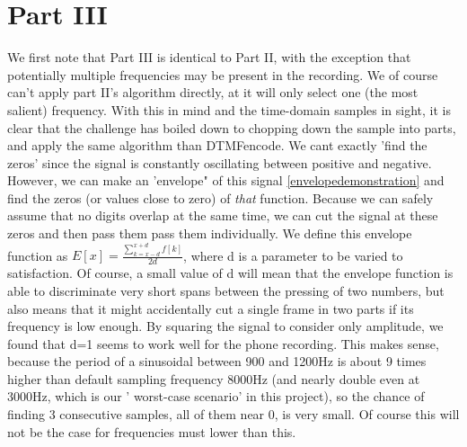 \documentclass{article}
\begin{document}
\section{Part III}
We first note that Part III is identical to Part II, with the exception that potentially multiple frequencies may be present in the recording. We of course can't apply part II's algorithm directly, at it will only select one (the most salient) frequency.
With this in mind and the time-domain samples in sight, it is clear that the challenge has boiled down to chopping down the sample into parts, and apply the same algorithm than DTMFencode.
We cant exactly 'find the zeros' since the signal is constantly oscillating between positive and negative. However, we can make an 'envelope" of this signal \ref{envelopedemonstration} and find the zeros (or values close to zero) of \emph{that} function. Because we can safely assume that no digits overlap at the same time, we can cut the signal at these zeros and then pass them pass them individually.
We define this envelope function as $E[x]=\frac{\sum_{k=x-d}^{x+d}f[k]}{2d}$, where d is a parameter to be varied to satisfaction.
Of course, a small value of d will mean that the envelope function is able to discriminate very short spans between the pressing of two numbers, but also means that it might accidentally cut a single frame in two parts if its frequency is low enough.
By squaring the signal to consider only amplitude, we found that d=1 seems to work well for the phone recording. This makes sense, because the period of a sinusoidal between 900 and 1200Hz is about 9 times higher than default sampling frequency  8000Hz (and nearly double even at 3000Hz, which is our ' worst-case scenario' in this project), so the chance of finding 3 consecutive samples, all of them near 0, is very small. Of course this will not be the case for frequencies must lower than this.
\end{document}
